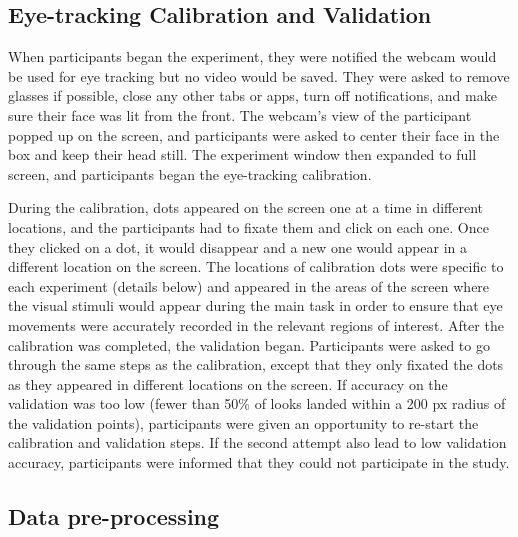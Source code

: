 \documentclass[
  english,
  man,floatsintext]{apa6}
\begin{document}
\hypertarget{eye-tracking-calibration-and-validation}{%
\subsection{Eye-tracking Calibration and Validation}\label{eye-tracking-calibration-and-validation}}

When participants began the experiment, they were notified the webcam would be used for eye tracking but no video would be saved. They were asked to remove glasses if possible, close any other tabs or apps, turn off notifications, and make sure their face was lit from the front. The webcam's view of the participant popped up on the screen, and participants were asked to center their face in the box and keep their head still. The experiment window then expanded to full screen, and participants began the eye-tracking calibration.

During the calibration, dots appeared on the screen one at a time in different locations, and the participants had to fixate them and click on each one. Once they clicked on a dot, it would disappear and a new one would appear in a different location on the screen. The locations of calibration dots were specific to each experiment (details below) and appeared in the areas of the screen where the visual stimuli would appear during the main task in order to ensure that eye movements were accurately recorded in the relevant regions of interest. After the calibration was completed, the validation began. Participants were asked to go through the same steps as the calibration, except that they only fixated the dots as they appeared in different locations on the screen. If accuracy on the validation was too low (fewer than 50\% of looks landed within a 200 px radius of the validation points), participants were given an opportunity to re-start the calibration and validation steps. If the second attempt also lead to low validation accuracy, participants were informed that they could not participate in the study.

\hypertarget{data-pre-processing}{%
\subsection{Data pre-processing}\label{data-pre-processing}}
\end{document}
